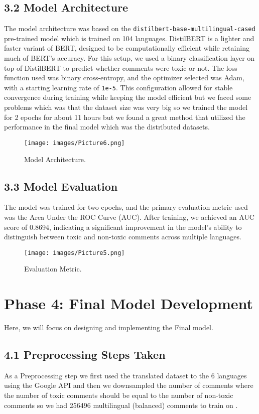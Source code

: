 \documentclass{article}
\begin{document}
\subsection*{3.2 Model Architecture}
The model architecture was based on the \texttt{distilbert-base-multilingual-cased} pre-trained model which is trained on 104 languages. DistilBERT is a lighter and faster variant of BERT, designed to be computationally efficient while retaining much of BERT's accuracy. For this setup, we used a binary classification layer on top of DistilBERT to predict whether comments were toxic or not. The loss function used was binary cross-entropy, and the optimizer selected was Adam, with a starting learning rate of \texttt{1e-5}. This configuration allowed for stable convergence during training while keeping the model efficient but we faced some problems which was that the dataset size was very big so we trained the model for 2 epochs for about 11 hours but we found a great method that utilized the performance in the final model which was the distributed datasets.

\begin{figure}[H]
  \centering
  \texttt{[image: images/Picture6.png]}
  \caption{Model Architecture.}
\end{figure}

\subsection*{3.3 Model Evaluation}
The model was trained for two epochs, and the primary evaluation metric used was the Area Under the ROC Curve (AUC). After training, we achieved an AUC score of 0.8694, indicating a significant improvement in the model's ability to distinguish between toxic and non-toxic comments across multiple languages.

\begin{figure}[H]
  \centering
  \texttt{[image: images/Picture5.png]}
  \caption{Evaluation Metric.}
\end{figure}
\section*{Phase 4: Final Model Development}
Here, we will focus on designing and implementing the Final  model.

\subsection*{4.1 Preprocessing Steps Taken}
As a Preprocessing step we first used the translated dataset to the 6 languages using the Google API and then we downsampled the number of comments where the number of toxic comments should be equal to the number of non-toxic comments so we had 256496 multilingual (balanced) comments to train on . \\
\\
\end{document}
